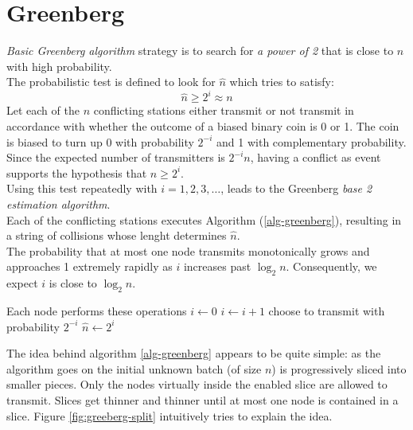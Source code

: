 \documentclass[12pt,a4paper]{report}
\newcommand{\algname}[1]{\ensuremath{\mbox{\sc #1}}}
\begin{document}
\section{Greenberg}


\emph{Basic Greenberg algorithm} strategy is to search for \emph{a power of 2} that is close to $n$ with high probability.\\
The probabilistic test is defined to look for $\hat{n}$ which tries to satisfy:\\
\begin{equation}
\hat{n}\geq 2^{i} \approx n
\end{equation}
Let each of the $n$ conflicting stations either transmit or not transmit in accordance with whether the outcome of a biased binary coin is 0 or 1. The coin is biased to turn up 0 with probability  $2^{-i}$ and 1 with complementary probability. Since the expected number of transmitters is $2^{-i}n$, having a conflict as event supports the hypothesis that $n\geq2^{i}$.\\
Using this test repeatedly with $i=1, 2, 3, \ldots$, leads to the Greenberg \emph{base 2 estimation algorithm}.\\
Each of the conflicting stations executes Algorithm (\ref{alg-greenberg}), resulting in a string of collisions whose lenght determines $\hat{n}$.\\

The probability that at most one node transmits monotonically grows and approaches 1 extremely rapidly as $i$ increases past $\log_{2}n$. Consequently, we expect $i$ is close to $\log_{2}n$.\\

\begin{algorithm}[H]
\begin{algorithmic}
\STATE \COMMENT Each node performs these operations
\STATE $i\gets 0$
\REPEAT
	\STATE $i\gets i+1$
	\STATE choose to transmit with probability $2^{-i}$
\STATE $\hat{n} \gets 2^{i}$
\end{algorithmic}
\caption{\algname{Basic Greenberg ($\mathcal{B}$)}}
\label{alg-greenberg}
\end{algorithm}

The idea behind algorithm \ref{alg-greenberg} appears to be quite simple: as the algorithm goes on the initial unknown batch (of size $n$) is progressively sliced into smaller pieces. Only the nodes virtually inside the enabled slice are allowed to transmit. Slices get thinner and thinner until at most one node is contained in a slice. Figure \ref{fig:greeberg-split} intuitively tries to explain the idea.\\ 
\end{document}
